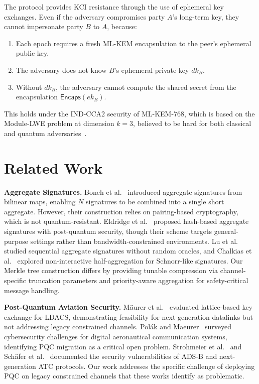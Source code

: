 \documentclass[conference,10pt]{IEEEtran}
\begin{document}
The protocol provides KCI resistance through the use of ephemeral key exchanges. Even if the adversary compromises party $A$'s long-term key, they cannot impersonate party $B$ to $A$, because:

\begin{enumerate}
    \item Each epoch requires a fresh ML-KEM encapsulation to the peer's ephemeral public key.
    \item The adversary does not know $B$'s ephemeral private key $dk_B$.
    \item Without $dk_B$, the adversary cannot compute the shared secret from the encapsulation $\mathsf{Encaps}(ek_B)$.
\end{enumerate}

This holds under the IND-CCA2 security of ML-KEM-768, which is based on the Module-LWE problem at dimension $k=3$, believed to be hard for both classical and quantum adversaries~\cite{fips203}.

\section{Related Work}
\label{sec:related}

\textbf{Aggregate Signatures.} Boneh et al.~\cite{boneh2003aggregate} introduced aggregate signatures from bilinear maps, enabling $N$ signatures to be combined into a single short aggregate. However, their construction relies on pairing-based cryptography, which is not quantum-resistant. Eldridge et al.~\cite{eldridge2023hash} proposed hash-based aggregate signatures with post-quantum security, though their scheme targets general-purpose settings rather than bandwidth-constrained environments. Lu et al.~\cite{lu2006sequential} studied sequential aggregate signatures without random oracles, and Chalkias et al.~\cite{chalkias2021noninteractive} explored non-interactive half-aggregation for Schnorr-like signatures. Our Merkle tree construction differs by providing tunable compression via channel-specific truncation parameters and priority-aware aggregation for safety-critical message handling.

\textbf{Post-Quantum Aviation Security.} M\"{a}urer et al.~\cite{maeurer2021ldacs, maeurer2022pqldacs} evaluated lattice-based key exchange for LDACS, demonstrating feasibility for next-generation datalinks but not addressing legacy constrained channels. Pol\'{a}k and Maeurer~\cite{polak2022ldacssurvey} surveyed cybersecurity challenges for digital aeronautical communication systems, identifying PQC migration as a critical open problem. Strohmeier et al.~\cite{strohmeier2015security} and Sch\"{a}fer et al.~\cite{schafer2014experimental} documented the security vulnerabilities of ADS-B and next-generation ATC protocols. Our work addresses the specific challenge of deploying PQC on legacy constrained channels that these works identify as problematic.
\end{document}
